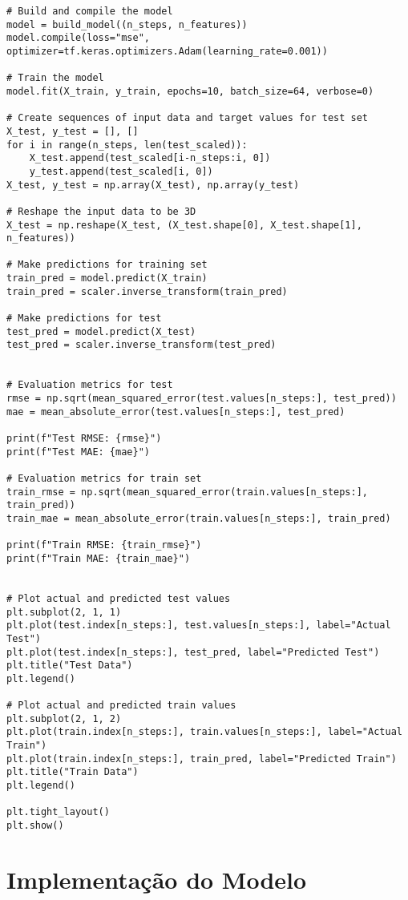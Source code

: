\begin{lstlisting}
# Build and compile the model
model = build_model((n_steps, n_features))
model.compile(loss="mse", optimizer=tf.keras.optimizers.Adam(learning_rate=0.001))

# Train the model
model.fit(X_train, y_train, epochs=10, batch_size=64, verbose=0)

# Create sequences of input data and target values for test set
X_test, y_test = [], []
for i in range(n_steps, len(test_scaled)):
    X_test.append(test_scaled[i-n_steps:i, 0])
    y_test.append(test_scaled[i, 0])
X_test, y_test = np.array(X_test), np.array(y_test)

# Reshape the input data to be 3D
X_test = np.reshape(X_test, (X_test.shape[0], X_test.shape[1], n_features))

# Make predictions for training set
train_pred = model.predict(X_train)
train_pred = scaler.inverse_transform(train_pred)

# Make predictions for test
test_pred = model.predict(X_test)
test_pred = scaler.inverse_transform(test_pred)


# Evaluation metrics for test
rmse = np.sqrt(mean_squared_error(test.values[n_steps:], test_pred))
mae = mean_absolute_error(test.values[n_steps:], test_pred)

print(f"Test RMSE: {rmse}")
print(f"Test MAE: {mae}")

# Evaluation metrics for train set
train_rmse = np.sqrt(mean_squared_error(train.values[n_steps:], train_pred))
train_mae = mean_absolute_error(train.values[n_steps:], train_pred)

print(f"Train RMSE: {train_rmse}")
print(f"Train MAE: {train_mae}")


# Plot actual and predicted test values
plt.subplot(2, 1, 1)
plt.plot(test.index[n_steps:], test.values[n_steps:], label="Actual Test")
plt.plot(test.index[n_steps:], test_pred, label="Predicted Test")
plt.title("Test Data")
plt.legend()

# Plot actual and predicted train values
plt.subplot(2, 1, 2)
plt.plot(train.index[n_steps:], train.values[n_steps:], label="Actual Train")
plt.plot(train.index[n_steps:], train_pred, label="Predicted Train")
plt.title("Train Data")
plt.legend()

plt.tight_layout()
plt.show()

\end{lstlisting}



\chapter{Implementação do Modelo}
\label{appendix:model-implementation}
